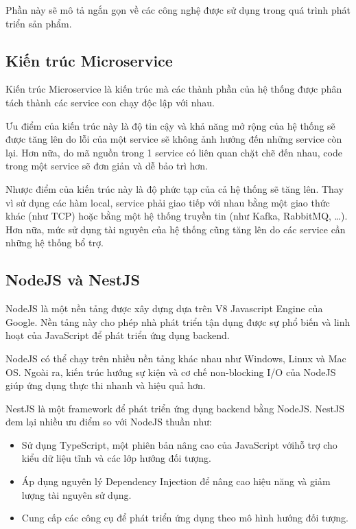 \documentclass[./../main.tex]{subfiles}
\begin{document}
Phần này sẽ mô tả ngắn gọn về các công nghệ được sử dụng trong quá trình
phát triển sản phẩm.

\hypertarget{kiux1ebfn-truxfac-microservice}{%
\subsection{Kiến trúc
Microservice}\label{kiux1ebfn-truxfac-microservice}}

Kiến trúc Microservice là kiến trúc mà các thành phần của hệ thống được
phân tách thành các service con chạy độc lập với nhau.

Ưu điểm của kiến trúc này là độ tin cậy và khả năng mở rộng của hệ thống
sẽ được tăng lên do lỗi của một service sẽ không ảnh hưởng đến những
service còn lại. Hơn nữa, do mã nguồn trong 1 service có liên quan chặt
chẽ đến nhau, code trong một service sẽ đơn giản và dễ bảo trì hơn.

Nhược điểm của kiến trúc này là độ phức tạp của cả hệ thống sẽ tăng lên.
Thay vì sử dụng các hàm local, service phải giao tiếp với nhau bằng một
giao thức khác (như TCP) hoặc bằng một hệ thống truyền tin (như Kafka,
RabbitMQ, \ldots). Hơn nữa, mức sử dụng tài nguyên của hệ thống cũng
tăng lên do các service cần những hệ thống bổ trợ.

\hypertarget{nodejs-vuxe0-nestjs}{%
\subsection{NodeJS và NestJS}\label{nodejs-vuxe0-nestjs}}

NodeJS là một nền tảng được xây dựng dựa trên V8 Javascript Engine của
Google. Nền tảng này cho phép nhà phát triển tận dụng được sự phổ biến
và linh hoạt của JavaScript để phát triển ứng dụng backend.

NodeJS có thể chạy trên nhiều nền tảng khác nhau như Windows, Linux và
Mac OS. Ngoài ra, kiến trúc hướng sự kiện và cơ chế non-blocking I/O của
NodeJS giúp ứng dụng thực thi nhanh và hiệu quả hơn.

NestJS là một framework để phát triển ứng dụng backend bằng NodeJS.
NestJS đem lại nhiều ưu điểm so với NodeJS thuần như:

\begin{itemize}
\item Sử dụng TypeScript, một phiên bản nâng cao của JavaScript vớihỗ trợ cho kiểu dữ liệu tĩnh và các lớp hướng đối tượng.
\item
  Áp dụng nguyên lý Dependency Injection để nâng cao hiệu năng và giảm
  lượng tài nguyên sử dụng.
\item
  Cung cấp các công cụ để phát triển ứng dụng theo mô hình hướng đối
  tượng.
\end{itemize}
\end{document}
